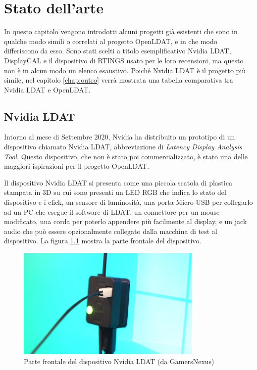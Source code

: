 \chapter{Stato dell'arte}
\label{chap:statoarte}

In questo capitolo vengono introdotti alcuni progetti già esistenti che sono in qualche modo simili o correlati al progetto OpenLDAT, e in che modo differiscono da esso. Sono stati scelti a titolo esemplificativo Nvidia LDAT, DisplayCAL e il dispositivo di RTINGS usato per le loro recensioni, ma questo non è in alcun modo un elenco esaustivo. Poiché Nvidia LDAT è il progetto più simile, nel capitolo \ref{chap:outro} verrà mostrata una tabella comparativa tra Nvidia LDAT e OpenLDAT.

\section{Nvidia LDAT}
Intorno al mese di Settembre 2020, Nvidia ha distribuito un prototipo di un dispositivo chiamato Nvidia LDAT, abbreviazione di \textit{Latency Display Analysis Tool}. Questo dispositivo, che non è stato poi commercializzato, è stato una delle maggiori ispirazioni per il progetto OpenLDAT.

Il dispositivo Nvidia LDAT si presenta come una piccola scatola di plastica stampata in 3D su cui sono presenti un LED RGB che indica lo stato del dispositivo e i click, un sensore di luminosità, una porta Micro-USB per collegarlo ad un PC che esegue il software di LDAT, un connettore per un mouse modificato, una corda per poterlo appendere più facilmente al display, e un jack audio che può essere opzionalmente collegato dalla macchina di test al dispositivo. La figura \ref{fig:nvldat_front} mostra la parte frontale del dispositivo.

\begin{figure}[h!]
	\centering
	\includegraphics[width=0.8\textwidth]{StatoDellArte_files/nvldat_front.jpg}
	\caption{Parte frontale del dispositivo Nvidia LDAT (da GamersNexus)}
	\label{fig:nvldat_front}
\end{figure}

